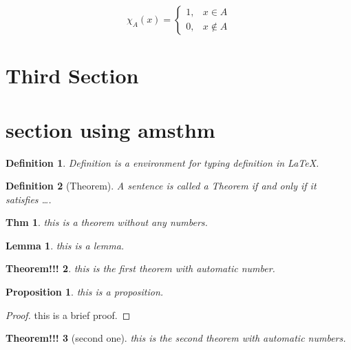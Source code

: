 \documentclass{article}
\newtheorem{definition}{Definition}            %
\newtheorem*{thmwn}{Thm}                       %
\newtheorem{theorem}{Theorem!!!}[section]      %
\newtheorem{lemma}[theorem]{Lemma}             %
\newtheorem{proposition}{Proposition}[section]
\begin{document}
    \begin{equation}
      \chi_A(x)=
      \left \{
      \begin{array}{ll}
        1, & x \in A \\
        0, & x \not\in A
      \end{array}
      \right. %
      \label{myquation}
    \end{equation}


    \section{Third Section}

    \section{section using amsthm}
    \begin{definition}
      Definition is a environment for typing definition in \LaTeX{}.
    \end{definition}

    \begin{definition}[Theorem]
      A sentence is called a Theorem if and only if it satisfies \dots.
    \end{definition}

    \begin{thmwn}
      this is a theorem without any numbers.
    \end{thmwn}

    \begin{lemma}
      this is a lemma.
    \end{lemma}

    \begin{theorem}
      this is the first theorem with automatic number.
    \end{theorem}

    \begin{proposition}
      this is a proposition.
    \end{proposition}

    \begin{proof}
      this is a brief proof.
    \end{proof}

    \begin{theorem}[second one]         %
      this is the second theorem with automatic numbers.
    \end{theorem}
\end{document}
